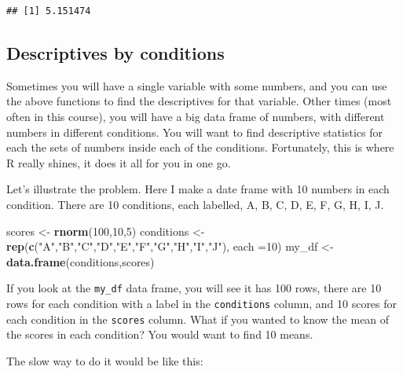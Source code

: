 \documentclass[]{book}
\newenvironment{Shaded}{\begin{snugshade}}{\end{snugshade}}
\newcommand{\KeywordTok}[1]{\textcolor[rgb]{0.13,0.29,0.53}{\textbf{{#1}}}}
\newcommand{\DataTypeTok}[1]{\textcolor[rgb]{0.13,0.29,0.53}{{#1}}}
\newcommand{\DecValTok}[1]{\textcolor[rgb]{0.00,0.00,0.81}{{#1}}}
\newcommand{\StringTok}[1]{\textcolor[rgb]{0.31,0.60,0.02}{{#1}}}
\newcommand{\NormalTok}[1]{{#1}}
\theoremstyle{definition}
\theoremstyle{definition}
\theoremstyle{definition}
\theoremstyle{remark}
\begin{document}
\begin{verbatim}
## [1] 5.151474
\end{verbatim}

\subsection{Descriptives by
conditions}\label{descriptives-by-conditions}

Sometimes you will have a single variable with some numbers, and you can
use the above functions to find the descriptives for that variable.
Other times (most often in this course), you will have a big data frame
of numbers, with different numbers in different conditions. You will
want to find descriptive statistics for each the sets of numbers inside
each of the conditions. Fortunately, this is where R really shines, it
does it all for you in one go.

Let's illustrate the problem. Here I make a date frame with 10 numbers
in each condition. There are 10 conditions, each labelled, A, B, C, D,
E, F, G, H, I, J.

\begin{Shaded}
\begin{Highlighting}[]
\NormalTok{scores <-}\StringTok{ }\KeywordTok{rnorm}\NormalTok{(}\DecValTok{100}\NormalTok{,}\DecValTok{10}\NormalTok{,}\DecValTok{5}\NormalTok{)}
\NormalTok{conditions <-}\StringTok{ }\KeywordTok{rep}\NormalTok{(}\KeywordTok{c}\NormalTok{(}\StringTok{"A"}\NormalTok{,}\StringTok{"B"}\NormalTok{,}\StringTok{"C"}\NormalTok{,}\StringTok{"D"}\NormalTok{,}\StringTok{"E"}\NormalTok{,}\StringTok{"F"}\NormalTok{,}\StringTok{"G"}\NormalTok{,}\StringTok{"H"}\NormalTok{,}\StringTok{"I"}\NormalTok{,}\StringTok{"J"}\NormalTok{), }\DataTypeTok{each =}\DecValTok{10}\NormalTok{)}
\NormalTok{my_df <-}\StringTok{ }\KeywordTok{data.frame}\NormalTok{(conditions,scores)}
\end{Highlighting}
\end{Shaded}

If you look at the \texttt{my\_df} data frame, you will see it has 100
rows, there are 10 rows for each condition with a label in the
\texttt{conditions} column, and 10 scores for each condition in the
\texttt{scores} column. What if you wanted to know the mean of the
scores in each condition? You would want to find 10 means.

The slow way to do it would be like this:

\begin{Shaded}
\end{Shaded}
\end{document}
